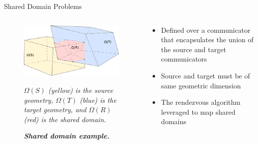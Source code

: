 \documentclass{beamer}
\begin{document}
\begin{frame}{Shared Domain Problems}

  \begin{columns}
    
    \begin{column}{0.5\textwidth}
      \begin{figure}[htpb!]
        \centering \includegraphics[width=2.5in]{overlapping_domain.pdf}
        \caption{\bf \sl Shared domain example.} {\sl $\Omega(S)$ (yellow)
          is the source geometry, $\Omega(T)$ (blue) is the target geometry,
          and $\Omega(R)$ (red) is the shared domain.}
        \label{fig:shared_domain}
      \end{figure}
    \end{column}

    \begin{column}{0.5\textwidth}
      \begin{itemize}
      \item Defined over a communicator that encapsulates the union of
        the source and target communicators
        \medskip
      \item Source and target must be of same geometric dimension
        \medskip
      \item The rendezvous algorithm leveraged to map shared domains
      \end{itemize}
    \end{column}

  \end{columns}

\end{frame}
\end{document}
